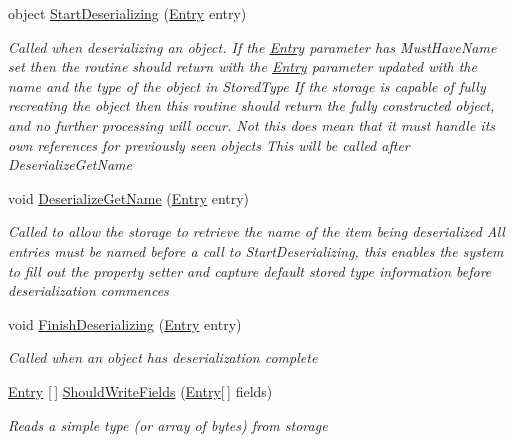 \begin{DoxyCompactItemize}
object \hyperlink{interface_serialization_1_1_i_storage_a90aa19f79a51acf057f20da842ef09b3}{Start\+Deserializing} (\hyperlink{class_serialization_1_1_entry}{Entry} entry)
\begin{DoxyCompactList}\small\item\em Called when deserializing an object. If the \hyperlink{class_serialization_1_1_entry}{Entry} parameter has Must\+Have\+Name set then the routine should return with the \hyperlink{class_serialization_1_1_entry}{Entry} parameter updated with the name and the type of the object in Stored\+Type If the storage is capable of fully recreating the object then this routine should return the fully constructed object, and no further processing will occur. Not this does mean that it must handle its own references for previously seen objects This will be called after Deserialize\+Get\+Name \end{DoxyCompactList}\item 
void \hyperlink{interface_serialization_1_1_i_storage_ad17a92256ad7a7196084e05bad968567}{Deserialize\+Get\+Name} (\hyperlink{class_serialization_1_1_entry}{Entry} entry)
\begin{DoxyCompactList}\small\item\em Called to allow the storage to retrieve the name of the item being deserialized All entries must be named before a call to Start\+Deserializing, this enables the system to fill out the property setter and capture default stored type information before deserialization commences \end{DoxyCompactList}\item 
void \hyperlink{interface_serialization_1_1_i_storage_a8377dea6764882fb9882d0bd92e03de6}{Finish\+Deserializing} (\hyperlink{class_serialization_1_1_entry}{Entry} entry)
\begin{DoxyCompactList}\small\item\em Called when an object has deserialization complete \end{DoxyCompactList}\item 
\hyperlink{class_serialization_1_1_entry}{Entry} \mbox{[}$\,$\mbox{]} \hyperlink{interface_serialization_1_1_i_storage_a0795ec3b6aa77280885c34e2822cb410}{Should\+Write\+Fields} (\hyperlink{class_serialization_1_1_entry}{Entry}\mbox{[}$\,$\mbox{]} fields)
\begin{DoxyCompactList}\small\item\em Reads a simple type (or array of bytes) from storage \end{DoxyCompactList}\item 

\end{DoxyCompactItemize}
